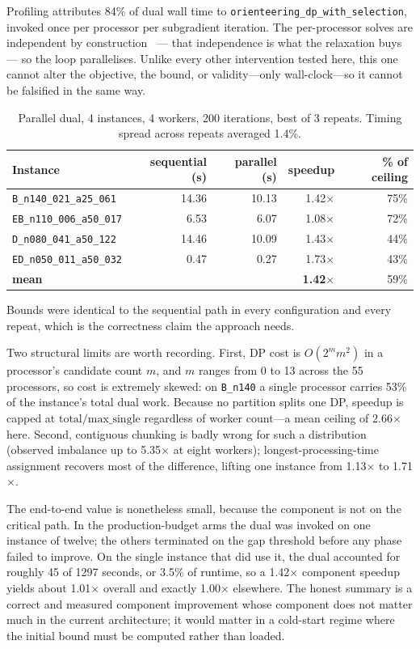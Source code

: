 Profiling attributes 84\% of dual wall time to \texttt{orienteering\_dp\_with\_selection}, invoked once per processor per subgradient iteration. The per-processor solves are independent by construction~\cite{Fisher1981Lagrangian} --- that independence is what the relaxation buys --- so the loop parallelises. Unlike every other intervention tested here, this one cannot alter the objective, the bound, or validity---only wall-clock---so it cannot be falsified in the same way.

\begin{table}[htbp]
\centering
\caption{Parallel dual, 4 instances, 4 workers, 200 iterations, best of 3 repeats. Timing spread across repeats averaged 1.4\%.}
\label{tab:parallel}
\begin{tabular}{lrrrr}
\toprule
Instance & sequential (s) & parallel (s) & speedup & \% of ceiling \\
\midrule
\texttt{B\_n140\_021\_a25\_061} & 14.36 & 10.13 & 1.42$\times$ & 75\% \\
\texttt{EB\_n110\_006\_a50\_017} & 6.53 & 6.07 & 1.08$\times$ & 72\% \\
\texttt{D\_n080\_041\_a50\_122} & 14.46 & 10.09 & 1.43$\times$ & 44\% \\
\texttt{ED\_n050\_011\_a50\_032} & 0.47 & 0.27 & 1.73$\times$ & 43\% \\
\midrule
\textbf{mean} & & & \textbf{1.42}$\times$ & 59\% \\
\bottomrule
\end{tabular}
\end{table}

Bounds were identical to the sequential path in every configuration and every repeat, which is the correctness claim the approach needs.

Two structural limits are worth recording. First, DP cost is $O(2^m m^2)$ in a processor's candidate count $m$, and $m$ ranges from 0 to 13 across the 55 processors, so cost is extremely skewed: on \texttt{B\_n140} a single processor carries 53\% of the instance's total dual work. Because no partition splits one DP, speedup is capped at $\text{total}/\text{max\_single}$ regardless of worker count---a mean ceiling of 2.66$\times$ here. Second, contiguous chunking is badly wrong for such a distribution (observed imbalance up to 5.35$\times$ at eight workers); longest-processing-time assignment recovers most of the difference, lifting one instance from 1.13$\times$ to 1.71$\times$.

The end-to-end value is nonetheless small, because the component is not on the critical path. In the production-budget arms the dual was invoked on one instance of twelve; the others terminated on the gap threshold before any phase failed to improve. On the single instance that did use it, the dual accounted for roughly 45 of 1297 seconds, or 3.5\% of runtime, so a 1.42$\times$ component speedup yields about 1.01$\times$ overall and exactly 1.00$\times$ elsewhere. The honest summary is a correct and measured component improvement whose component does not matter much in the current architecture; it would matter in a cold-start regime where the initial bound must be computed rather than loaded.
